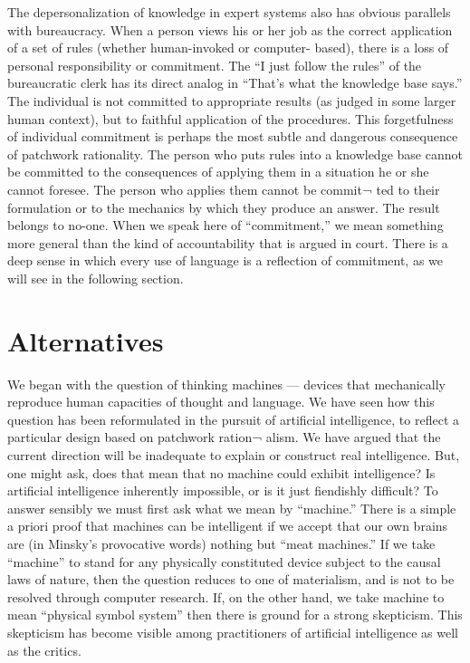 \documentclass[12pt]{article}
\begin{document}
The depersonalization of knowledge in expert systems also has obvious parallels with bureaucracy. When a person views his or her job as the correct application of a set of rules (whether human-invoked or computer- based), there is a loss of personal responsibility or commitment. The “I just follow the rules” of the bureaucratic clerk has its direct analog in “That’s what the knowledge base says.” The individual is not committed to appropriate results (as judged in some larger human context), but to faithful application of the procedures. This forgetfulness of individual commitment is perhaps the most subtle and dangerous consequence of patchwork rationality. The person who puts rules into a knowledge base cannot be committed to the consequences of applying them in a situation he or she cannot foresee. The person who applies them cannot be commit¬ ted to their formulation or to the mechanics by which they produce an answer. The result belongs to no-one. When we speak here of “commitment,” we mean something more general than the kind of accountability that is argued in court. There is a deep sense in which every use of language is a reflection of commitment, as we will see in the following section.

\section{Alternatives}

We began with the question of thinking machines --- devices that mechanically reproduce human capacities of thought and language. We have seen how this question has been reformulated in the pursuit of artificial intelligence, to reflect a particular design based on patchwork ration¬ alism. We have argued that the current direction will be inadequate to explain or construct real intelligence.
But, one might ask, does that mean that no machine could exhibit intelligence? Is artificial intelligence inherently impossible, or is it just fiendishly difficult? To answer sensibly we must first ask what we mean by “machine.” There is a simple a priori proof that machines can be intelligent if we accept that our own brains are (in Minsky’s provocative words) nothing but “meat machines.” If we take “machine” to stand for any physically constituted device subject to the causal laws of nature, then the question reduces to one of materialism, and is not to be resolved through computer research. If, on the other hand, we take machine to mean “physical symbol system” then there is ground for a strong skepticism. This skepticism has become visible among practitioners of artificial intelligence as well as the critics.
\end{document}

